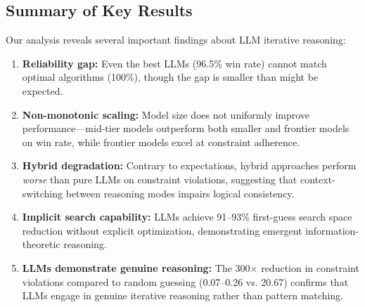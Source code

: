 \subsection{Summary of Key Results}

Our analysis reveals several important findings about LLM iterative reasoning:

\begin{enumerate}
    \item \textbf{Reliability gap:} Even the best LLMs (96.5\% win rate) cannot match optimal algorithms (100\%), though the gap is smaller than might be expected.

    \item \textbf{Non-monotonic scaling:} Model size does not uniformly improve performance---mid-tier models outperform both smaller and frontier models on win rate, while frontier models excel at constraint adherence.

    \item \textbf{Hybrid degradation:} Contrary to expectations, hybrid approaches perform \textit{worse} than pure LLMs on constraint violations, suggesting that context-switching between reasoning modes impairs logical consistency.

    \item \textbf{Implicit search capability:} LLMs achieve 91--93\% first-guess search space reduction without explicit optimization, demonstrating emergent information-theoretic reasoning.

    \item \textbf{LLMs demonstrate genuine reasoning:} The 300$\times$ reduction in constraint violations compared to random guessing (0.07--0.26 vs. 20.67) confirms that LLMs engage in genuine iterative reasoning rather than pattern matching.
\end{enumerate}
